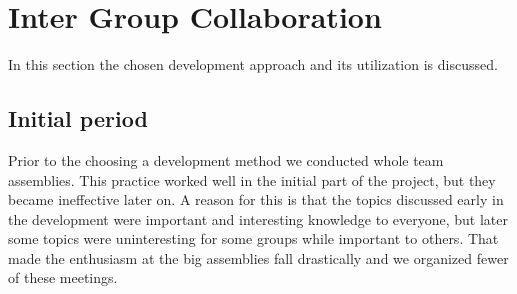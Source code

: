 \section{Inter Group Collaboration}
\label{sec:intergroup}
In this section the chosen development approach and its utilization is discussed. 

\subsection{Initial period}
Prior to the choosing a development method we conducted whole team assemblies. 
This practice worked well in the initial part of the project, but they became ineffective later on. 
A reason for this is that the topics discussed early in the development were important and interesting knowledge to everyone, but later some topics were uninteresting for some groups while important to others.
That made the enthusiasm at the big assemblies fall drastically and we organized fewer of these meetings.


